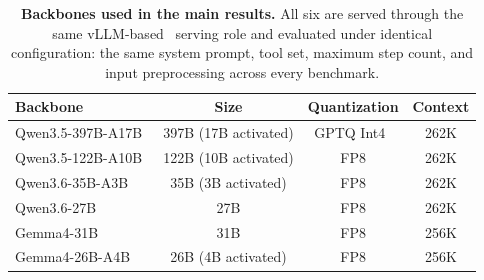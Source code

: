 \begin{table}[h]
\caption{\textbf{Backbones used in the main results.} All six are served through the same vLLM-based~\citep{kwon2023efficient} serving role and evaluated under identical configuration: the same system prompt, tool set, maximum step count, and input preprocessing across every benchmark.}
\label{tab:backbones}
\centering
\setlength{\tabcolsep}{6pt}
\renewcommand{\arraystretch}{1.15}
{\small
\begin{tabular}{lccc}
\toprule
\textbf{Backbone} & \textbf{Size} & \textbf{Quantization} & \textbf{Context} \\
\midrule
Qwen3.5-397B-A17B~\citep{qwen3.5}        & 397B (17B activated) & GPTQ Int4~\citep{frantar-gptq} & 262K \\
Qwen3.5-122B-A10B~\citep{qwen3.5}        & 122B (10B activated) & FP8       & 262K \\
Qwen3.6-35B-A3B~\citep{qwen36_35b_a3b}   & 35B  (3B activated)  & FP8       & 262K \\
Qwen3.6-27B~\citep{qwen3.6-27b}          & 27B                  & FP8       & 262K \\
Gemma4-31B~\citep{gemma4}                & 31B                  & FP8       & 256K \\
Gemma4-26B-A4B~\citep{gemma4}            & 26B  (4B activated)  & FP8       & 256K \\
\bottomrule
\end{tabular}}
\end{table}
